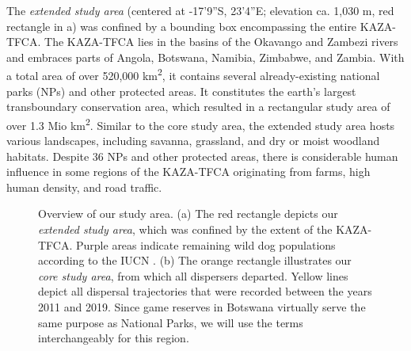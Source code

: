 \documentclass[abstract=on,10pt,a4paper,bibliography=totocnumbered]{scrartcl}
\begin{document}
The \textit{extended study area} (centered at -17'9''S, 23'4''E; elevation ca. 1,030 m, red rectangle in a) was confined
by a bounding box encompassing the entire KAZA-TFCA. The KAZA-TFCA lies in the
basins of the Okavango and Zambezi rivers and embraces parts of Angola,
Botswana, Namibia, Zimbabwe, and Zambia. With a total area of over 520,000
km\textsuperscript{2}, it contains several already-existing national parks (NPs)
and other protected areas. It constitutes the earth's largest transboundary
conservation area, which resulted in a rectangular study area of over 1.3 Mio
km\textsuperscript{2}. Similar to the core study area, the extended study area
hosts various landscapes, including savanna, grassland, and dry or moist
woodland habitats. Despite 36 NPs and other protected areas, there is
considerable human influence in some regions of the KAZA-TFCA originating from
farms, high human density, and road traffic.

\begin{figure}[h]
  \begin{center}
    \caption{Overview of our study area. (a) The red rectangle depicts our
    \textit{extended study area}, which was confined by the extent of the
    KAZA-TFCA. Purple areas indicate remaining wild dog populations according to
    the IUCN \citep{Woodroffe.2012}. (b) The orange rectangle illustrates our
    \textit{core study area}, from which all dispersers departed. Yellow lines
    depict all dispersal trajectories that were recorded between the years 2011
    and 2019. Since game reserves in Botswana virtually serve the same purpose as
    National Parks, we will use the terms interchangeably for this region.}
    \label{StudyArea}
  \end{center}
\end{figure}
\end{document}
